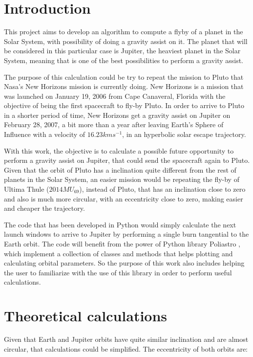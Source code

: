 \section{Introduction}

This project aims to develop an algorithm to compute a flyby of a planet in the
Solar System, with possibility of doing a gravity assist on it. The planet that will
be considered in this particular case is Jupiter, the heaviest planet in the Solar
System, meaning that is one of the best possibilities to perform a gravity assist.

The purpose of this calculation could be try to repeat the mission to Pluto that
Nasa's New Horizons mission \cite{NASA_NewHorizons} is currently doing. New Horizons
is a mission that was launched on January 19, 2006 from Cape Canaveral, Florida
with the objective of being the first spacecraft to fly-by Pluto. In order to arrive
to Pluto in a shorter period of time, New Horizons get a gravity assist on Jupiter
on February 28, 2007, a bit more than a year after leaving Earth's Sphere of Influence
with a velocity of $16.23 km s^{-1}$, in an hyperbolic solar escape trajectory.

With this work, the objective is to calculate a possible future opportunity to perform
a gravity assist on Jupiter, that could send the spacecraft again to Pluto. Given
that the orbit of Pluto has a inclination quite different from the rest of planets
in the Solar System, an easier mission would be repeating the fly-by of
Ultima Thule ($2014 MU_{69}$), instead of Pluto, that has an inclination close to
zero and also is much more circular, with an eccentricity close to zero, making easier
and cheaper the trajectory.

The code that has been developed in Python would simply calculate the next launch
windows to arrive to Jupiter by performing a single burn tangential to the Earth
orbit. The code will benefit from the power of Python library Poliastro \cite{poliastro},
which implement a collection of classes and methods that helps plotting and calculating
orbital parameters. So the purpose of this work also includes helping the user to
familiarize with the use of this library in order to perform useful calculations.

\section{Theoretical calculations}

Given that Earth and Jupiter orbits have quite similar inclination and are almost
circular, that calculations could be simplified. The eccentricity of both orbits
are:

